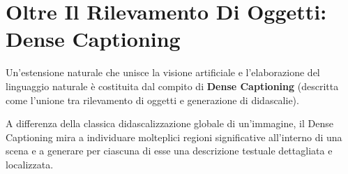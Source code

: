﻿\documentclass[11pt, a4paper]{article}
\begin{document}

\newpage

\section{Oltre Il Rilevamento Di Oggetti: Dense Captioning}

Un'estensione naturale che unisce la visione artificiale e l'elaborazione del linguaggio naturale è costituita dal compito di \textbf{Dense Captioning} (descritta come l'unione tra rilevamento di oggetti e generazione di didascalie).

A differenza della classica didascalizzazione globale di un'immagine, il Dense Captioning mira a individuare molteplici regioni significative all'interno di una scena e a generare per ciascuna di esse una descrizione testuale dettagliata e localizzata.

\end{document}
